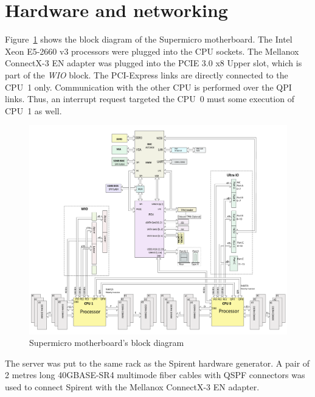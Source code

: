 
\section{Hardware and networking}\label{sec:setup-hardware}
Figure~\ref{fig:setup-supermicro-board} shows the block diagram of the Supermicro motherboard.
The Intel Xeon E5-2660 v3 processors were plugged into the CPU sockets.
The Mellanox ConnectX-3 EN adapter was plugged into the PCIE 3.0 x8 Upper slot,
which is part of the {\it{WIO}} block.
The PCI-Express links are directly connected to the CPU~1 only.
Communication with the other CPU is performed over the QPI links.
Thus, an interrupt request targeted the CPU~0 must some execution of CPU~1 as well.
\begin{figure}
	\centering
	\includegraphics[width=15cm,keepaspectratio]{fig/supermicro-x10drui.png}
	\caption{Supermicro motherboard's block diagram}
	\label{fig:setup-supermicro-board}
\end{figure}

The server was put to the same rack as the Spirent hardware generator.
A pair of 2 metres long 40GBASE-SR4 multimode fiber cables with QSPF connectors
was used to connect Spirent with the Mellanox ConnectX-3 EN adapter.


